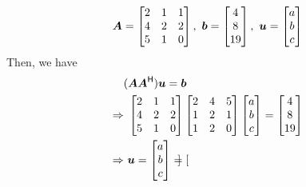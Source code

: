 \documentclass[a4paper,12pt]{article}
\begin{document}
\begin{enumerate}
\begin{equation}
        \boldsymbol{A} = \begin{bmatrix}
            2 & 1 & 1 \\
            4 & 2 & 2 \\
            5 & 1 & 0
        \end{bmatrix}, \ \boldsymbol{b} = \begin{bmatrix}
            4 \\
            8 \\
            19
        \end{bmatrix}, \ \boldsymbol{u} = \begin{bmatrix}
            a \\
            b \\
            c
        \end{bmatrix}
    \end{equation} Then, we have \begin{equation}
        \begin{aligned}
            & (\boldsymbol{A}\boldsymbol{A}^{\mathsf{H}})\boldsymbol{u} = \boldsymbol{b} \\
            \Rightarrow & \ \begin{bmatrix}
                2 & 1 & 1 \\
                4 & 2 & 2 \\
                5 & 1 & 0
            \end{bmatrix} \begin{bmatrix}
                2 & 4 & 5 \\
                1 & 2 & 1 \\
                1 & 2 & 0
            \end{bmatrix} \begin{bmatrix}
                a \\
                b \\
                c
            \end{bmatrix} = \begin{bmatrix}
                4 \\
                8 \\
                19
            \end{bmatrix} \\
            \Rightarrow & \ \boldsymbol{u} = \begin{bmatrix}
                a \\
                b \\
                c
            \end{bmatrix} = \begin{bmatrix}

\end{bmatrix}
\end{aligned}
\end{equation}
\end{enumerate}
\end{document}
